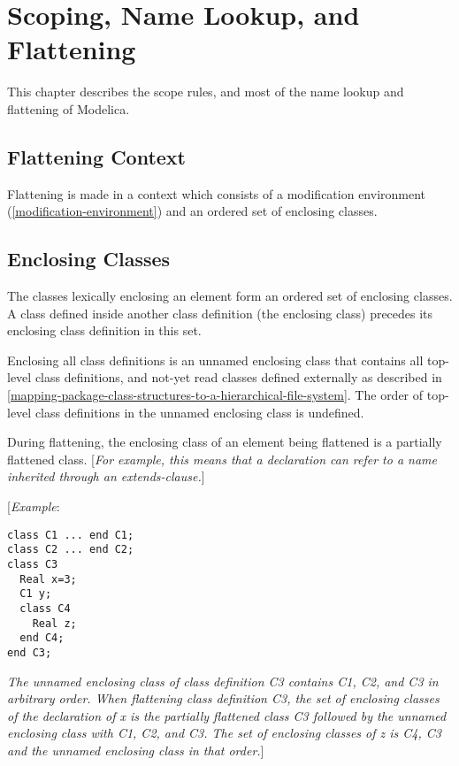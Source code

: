 \chapter{Scoping, Name Lookup, and Flattening}

This chapter describes the scope rules, and most of the name lookup and
flattening of Modelica.

\section{Flattening Context}

Flattening is made in a context which consists of a modification
environment (\ref{modification-environment}) and an ordered set of enclosing classes.

\section{Enclosing Classes}

The classes lexically enclosing an element form an ordered set of
enclosing classes. A class defined inside another class definition (the
enclosing class) precedes its enclosing class definition in this set.

Enclosing all class definitions is an unnamed enclosing class that
contains all top-level class definitions, and not-yet read classes
defined externally as described in \ref{mapping-package-class-structures-to-a-hierarchical-file-system}. The order of
top-level class definitions in the unnamed enclosing class is undefined.

During flattening, the enclosing class of an element being flattened is
a partially flattened class. {[}\emph{For example, this means that a
declaration can refer to a name inherited through an extends-clause.}{]}

{[}\emph{Example}:
\begin{lstlisting}[language=Modelica]
class C1 ... end C1;
class C2 ... end C2;
class C3
  Real x=3;
  C1 y;
  class C4
    Real z;
  end C4;
end C3;
\end{lstlisting}

\emph{The unnamed enclosing class of class definition C3 contains C1,
C2, and C3 in arbitrary order. When flattening class definition C3, the
set of enclosing classes of the declaration of x is the partially
flattened class C3 followed by the unnamed enclosing class with C1, C2,
and C3. The set of enclosing classes of z is C4, C3 and the unnamed
enclosing class in that order.}{]}

